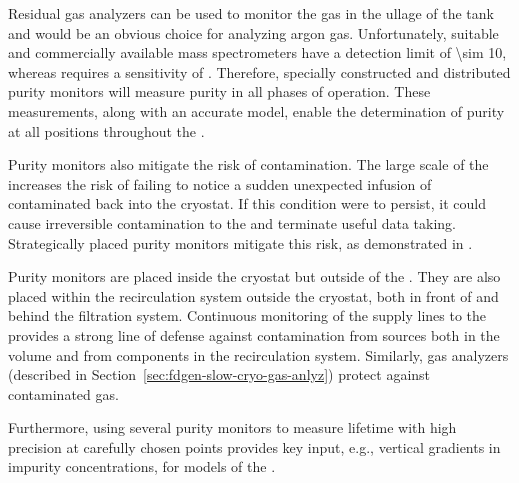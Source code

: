 Residual gas analyzers can be used to monitor the gas in the ullage of the tank and would be an obvious choice for analyzing argon gas. 
Unfortunately, suitable and commercially available mass
spectrometers have a detection limit of \SI{\sim 10}{},
whereas  requires a sensitivity of . Therefore,
specially constructed and distributed purity monitors will measure \lar purity in all %
phases of operation. %
These measurements,
along with an accurate  model, enable the
determination of purity at all positions throughout the .


Purity monitors also %
mitigate the risk of \lar contamination.  The large scale of the  increases the risk of failing to notice a sudden unexpected infusion of contaminated \lar %
back into the cryostat.   
If this condition were to persist, it could cause irreversible contamination to the  and terminate useful data taking.  Strategically placed purity monitors mitigate this risk, as demonstrated in . 

Purity monitors are placed inside the cryostat but outside of the %
. They are also placed  within the recirculation system outside the cryostat, both in front of and behind the filtration system. %
Continuous monitoring of  the \lar supply lines to the  provides a strong line of defense against %
contamination from sources both in the \lar volume and from components in the recirculation system. 
Similarly, gas analyzers (described in Section~\ref{sec:fdgen-slow-cryo-gas-anlyz}) %
protect against contaminated gas.  

Furthermore, using several purity monitors to measure lifetime with high precision at carefully chosen points provides key input, e.g.,  vertical gradients in impurity concentrations, for  models of the .

